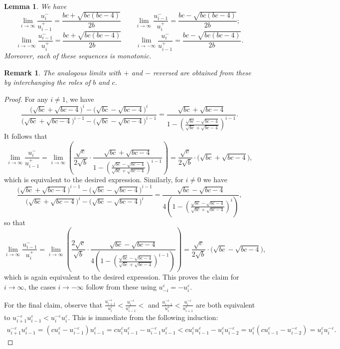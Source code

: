 \documentclass{amsart}
\newtheorem{lemma}[theorem]{Lemma}
\newtheorem{remark}[theorem]{Remark}
\numberwithin{theorem}{section}
\begin{document}
  \begin{lemma}
    We have
    \[\lim_{i\to\infty} \frac{u_i^-}{u_{i-1}^+}=\frac{bc+\sqrt{bc(bc-4)}}{2b} \qquad \lim_{i\to\infty} \frac{u_{i-1}^-}{u_i^+}=\frac{bc-\sqrt{bc(bc-4)}}{2b};\]
    \[\lim_{i\to-\infty} \frac{u_{i-1}^-}{u_i^+}=\frac{bc+\sqrt{bc(bc-4)}}{2b} \qquad \lim_{i\to-\infty} \frac{u_i^-}{u_{i-1}^+}=\frac{bc-\sqrt{bc(bc-4)}}{2b}.\]
    Moreover, each of these sequences is monotonic.
  \end{lemma}
  \begin{remark}
    The analogous limits with $+$ and $-$ reversed are obtained from these by interchanging the roles of $b$ and $c$.
  \end{remark}
  \begin{proof}
    For any $i\ne1$, we have
    \[\frac{\big(\sqrt{bc}+\sqrt{bc-4}\big)^i-\big(\sqrt{bc}-\sqrt{bc-4}\big)^i}{\big(\sqrt{bc}+\sqrt{bc-4}\big)^{i-1}-\big(\sqrt{bc}-\sqrt{bc-4}\big)^{i-1}}=\frac{\sqrt{bc}+\sqrt{bc-4}}{1-\left(\frac{\sqrt{bc}-\sqrt{bc-4}}{\sqrt{bc}+\sqrt{bc-4}}\right)^{i-1}}.\]
    It follows that
    \[\lim_{i\to\infty} \frac{u_i^-}{u_{i-1}^+} = \lim_{i\to\infty} \left( \frac{\sqrt{c}}{2\sqrt{b}}\cdot\frac{\sqrt{bc}+\sqrt{bc-4}}{1-\left(\frac{\sqrt{bc}-\sqrt{bc-4}}{\sqrt{bc}+\sqrt{bc-4}}\right)^{i-1}} \right) = \frac{\sqrt{c}}{2\sqrt{b}}\cdot\big(\sqrt{bc}+\sqrt{bc-4}\big),\]
    which is equivalent to the desired expression.
    Similarly, for $i\ne0$ we have
    \[\frac{\big(\sqrt{bc}+\sqrt{bc-4}\big)^{i-1}-\big(\sqrt{bc}-\sqrt{bc-4}\big)^{i-1}}{\big(\sqrt{bc}+\sqrt{bc-4}\big)^i-\big(\sqrt{bc}-\sqrt{bc-4}\big)^i}=\frac{\sqrt{bc}-\sqrt{bc-4}}{4\left(1-\left(\frac{\sqrt{bc}-\sqrt{bc-4}}{\sqrt{bc}+\sqrt{bc-4}}\right)^i\right)},\]
    so that
    \[\lim_{i\to\infty} \frac{u_{i-1}^-}{u_i^+} = \lim_{i\to\infty} \left( \frac{2\sqrt{c}}{\sqrt{b}}\cdot\frac{\sqrt{bc}-\sqrt{bc-4}}{4\left(1-\left(\frac{\sqrt{bc}-\sqrt{bc-4}}{\sqrt{bc}+\sqrt{bc-4}}\right)^{i-1}\right)} \right) = \frac{\sqrt{c}}{2\sqrt{b}}\cdot\big(\sqrt{bc}-\sqrt{bc-4}\big),\]
    which is again equivalent to the desired expression.
    This proves the claim for $i\to\infty$, the cases $i\to-\infty$ follow from these using $u_{-i}^\varepsilon=-u_i^\varepsilon$.

    For the final claim, observe that $\frac{u_{i+1}^{-\varepsilon}}{u_i^\varepsilon}<\frac{u_i^{-\varepsilon}}{u_{i-1}^\varepsilon}<$ and $\frac{u_{i-1}^{-\varepsilon}}{u_i^\varepsilon}<\frac{u_i^{-\varepsilon}}{u_{i+1}^\varepsilon}$ are both equivalent to $u_{i+1}^{-\varepsilon}u_{i-1}^\varepsilon<u_i^{-\varepsilon}u_i^\varepsilon$.
    This is immediate from the following induction:
    \begin{align*}
      u_{i+1}^{-\varepsilon}u_{i-1}^\varepsilon
      =(cu_i^\varepsilon-u_{i-1}^{-\varepsilon})u_{i-1}^\varepsilon
      =cu_i^\varepsilon u_{i-1}^\varepsilon-u_{i-1}^{-\varepsilon} u_{i-1}^\varepsilon
      <cu_i^\varepsilon u_{i-1}^\varepsilon-u_i^\varepsilon u_{i-2}^{-\varepsilon}
      =u_i^\varepsilon(cu_{i-1}^\varepsilon-u_{i-2}^{-\varepsilon})
      =u_i^\varepsilon u_i^{-\varepsilon}.
    \end{align*}
  \end{proof}
\end{document}

